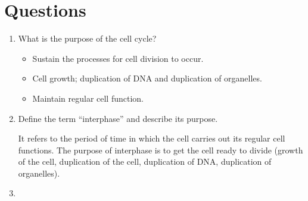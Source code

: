 \documentclass[12pt]{report}
\begin{document}
\section{Questions}
\begin{enumerate}
\setlength\itemsep{1em}
    \item{What is the purpose of the cell cycle?}
        \begin{solution}
            \invis
            \begin{itemize}
                \item{Sustain the processes for cell division to occur.}
                \item{Cell growth; duplication of DNA and duplication of organelles.}
                \item{Maintain regular cell function.}
            \end{itemize}
        \end{solution}

    \item{Define the term ``interphase'' and describe its purpose.}
        \begin{solution}
            It refers to the period of time in which the cell carries out its regular cell functions. The purpose of interphase is to get the cell ready to divide (growth of the cell, duplication of the cell, duplication of DNA, duplication of organelles).
        \end{solution}

    \item{
        }


\end{enumerate}
\end{document}
